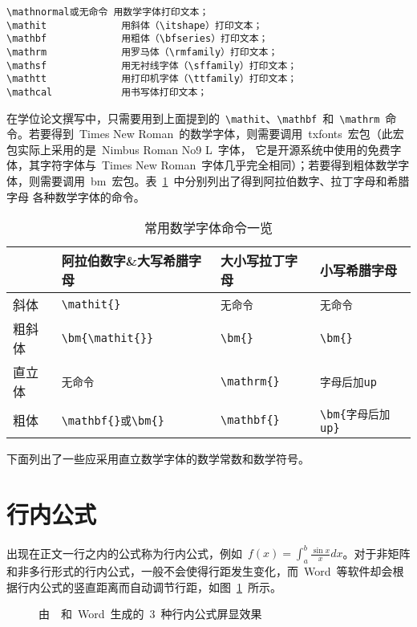 \begin{verbatim}
\mathnormal或无命令 用数学字体打印文本；
\mathit             用斜体（\itshape）打印文本；
\mathbf             用粗体（\bfseries）打印文本；
\mathrm             用罗马体（\rmfamily）打印文本；
\mathsf             用无衬线字体（\sffamily）打印文本；
\mathtt             用打印机字体（\ttfamily）打印文本；
\mathcal            用书写体打印文本；
\end{verbatim}

在学位论文撰写中，只需要用到上面提到的~\verb|\mathit|、\verb|\mathbf|~和~\verb|\mathrm|~命令。若要得到~Times New Roman~的数学字体，则需要调用~txfonts~宏包（此宏包实际上采用的是~Nimbus Roman No9 L~字体，
它是开源系统中使用的免费字体，其字符字体与~Times New Roman~字体几乎完全相同）；若要得到粗体数学字体，则需要调用~bm~宏包。表~\ref{tab:fonts}~中分别列出了得到阿拉伯数字、拉丁字母和希腊字母
各种数学字体的命令。

\begin{table}[htbp]
\caption{常用数学字体命令一览}\label{tab:fonts}
\vspace{0.5em}\centering\wuhao
\begin{tabular}{llll}
\toprule
 & 阿拉伯数字\&大写希腊字母 & 大小写拉丁字母 & 小写希腊字母  \\
\midrule
斜体 & \verb|\mathit{}| & \verb|无命令| & \verb|无命令|\\
粗斜体 & \verb|\bm{\mathit{}}| & \verb|\bm{}| & \verb|\bm{}|\\
直立体 & \verb|无命令| & \verb|\mathrm{}| & \verb|字母后加up|\\
粗体 & \verb|\mathbf{}或\bm{}| & \verb|\mathbf{}| & \verb|\bm{字母后加up}|\\
\bottomrule
\end{tabular}
\vspace{\baselineskip}
\end{table}

\noindent 下面列出了一些应采用直立数学字体的数学常数和数学符号。

\section{行内公式}
出现在正文一行之内的公式称为行内公式，例如~$f(x)=\int_{a}^{b}\frac{\sin{x}}{x}dx$。对于非矩阵和非多行形式的行内公式，一般不会使得行距发生变化，而~Word~等软件却会根据行内公式的竖直距离而自动调节行距，如图~\ref{fig:hangju}~所示。

\begin{figure}[htbp]
\centering
{}

\caption{由~\XeLaTeX~和~Word~生成的~3~种行内公式屏显效果}\label{fig:hangju}
\vspace{-1em}
\end{figure}

